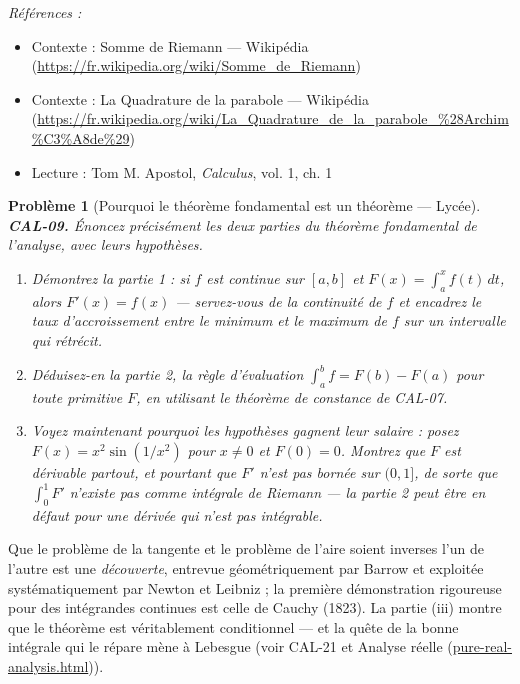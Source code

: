 \documentclass[11pt]{article}
\newtheorem{problem}{Problème}
\newenvironment{refs}{\par\small\noindent\emph{Références :}\begin{itemize}\setlength\itemsep{0pt}}{\end{itemize}\normalsize}
\begin{document}
\begin{refs}
\item Contexte : Somme de Riemann --- Wikipédia (\url{https://fr.wikipedia.org/wiki/Somme_de_Riemann})
\item Contexte : La Quadrature de la parabole --- Wikipédia (\url{https://fr.wikipedia.org/wiki/La_Quadrature_de_la_parabole_%28Archim%C3%A8de%29})
\item Lecture : Tom M. Apostol, \textit{Calculus}, vol. 1, ch. 1
\end{refs}

\bigskip

\begin{problem}[{Pourquoi le théorème fondamental est un théorème --- Lycée}]
\textbf{CAL-09.} Énoncez précisément les deux parties du théorème fondamental
de l'analyse, avec leurs hypothèses.
\begin{enumerate}
\item[(i)] Démontrez la partie 1 : si $ f $ est continue sur
$ [a,b] $ et $ F(x) = \int_a^x f(t)\,dt $, alors $ F'(x) = f(x) $ --- servez-vous de la continuité
de $ f $ et encadrez le taux d'accroissement entre le minimum et le maximum de $ f $
sur un intervalle qui rétrécit.
\item[(ii)] Déduisez-en la partie 2, la règle d'évaluation
$ \int_a^b f = F(b) - F(a) $ pour toute primitive $ F $, en utilisant le théorème
de constance de CAL-07.
\item[(iii)] Voyez maintenant pourquoi les hypothèses gagnent leur salaire : posez
$ F(x) = x^2 \sin(1/x^2) $ pour $ x\ne 0 $ et $ F(0)=0 $. Montrez que $ F $ est
dérivable partout, et pourtant que $ F' $ n'est pas bornée sur $ (0,1] $, de sorte que
$ \int_0^1 F' $ n'existe pas comme intégrale de Riemann --- la partie 2 peut être en défaut pour une dérivée
qui n'est pas intégrable.
\end{enumerate}

\end{problem}

\noindent Que le problème de la tangente et le problème de l'aire soient inverses l'un de l'autre
est une \textit{découverte}, entrevue géométriquement par Barrow et exploitée systématiquement par
Newton et Leibniz ; la première démonstration rigoureuse pour des intégrandes continues est celle de Cauchy
(1823). La partie (iii) montre que le théorème est véritablement conditionnel --- et la quête de la
\og{} bonne \fg{} intégrale qui le répare mène à Lebesgue (voir CAL-21 et
Analyse réelle (\url{pure-real-analysis.html})).
\end{document}
